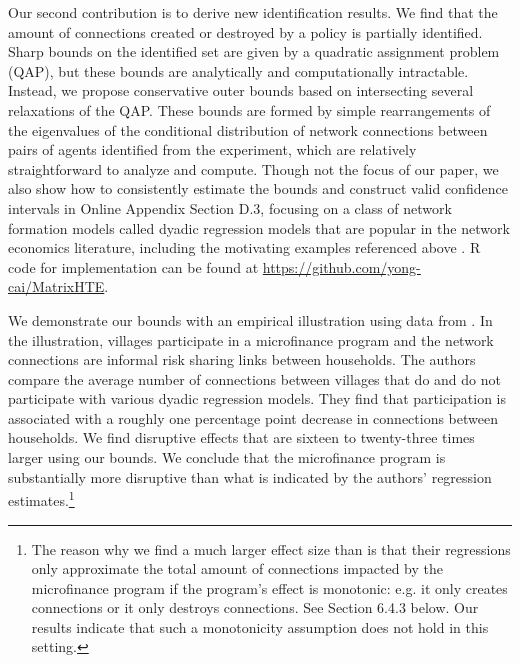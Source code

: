 \documentclass[12pt]{article}
\theoremstyle{definition}
\begin{document}
Our second contribution is to derive new identification results. We find that the amount of connections created or destroyed by a policy is partially identified. Sharp bounds on the identified set are given by a quadratic assignment problem (QAP), but these bounds are analytically and computationally intractable. Instead, we propose conservative outer bounds based on intersecting several relaxations of the QAP. These bounds are formed by simple rearrangements of the eigenvalues of the conditional distribution of network connections between pairs of agents identified from the experiment, which are relatively straightforward to analyze and compute. Though not the focus of our paper, we also show how to consistently estimate the bounds and construct valid confidence intervals in Online Appendix Section D.3, focusing on a class of network formation models called dyadic regression models that are popular in the network economics literature, including the motivating examples referenced above \citep[for a textbook treatment, see Section 4 of][]{graham2020network}. R code for implementation can be found at \url{https://github.com/yong-cai/MatrixHTE}.   


We demonstrate our bounds with an empirical illustration using data from \cite{banerjee2021changes}. In the illustration, villages participate in a microfinance program and the network connections are informal risk sharing links between households. The authors compare the average number of connections between villages that do and do not participate with various dyadic regression models. They find that participation is associated with a roughly one percentage point decrease in connections between households. We find disruptive effects that are sixteen to twenty-three times larger using our bounds. We conclude that the microfinance program is substantially more disruptive than what is indicated by the authors' regression estimates.\footnote{The reason why we find a much larger effect size than \cite{banerjee2021changes} is that their regressions only approximate the total amount of connections impacted by the microfinance program if the program's effect is monotonic: e.g. it only creates connections or it only destroys connections. See Section 6.4.3 below. Our results indicate that such a monotonicity assumption does not hold in this setting.   } %
\end{document}
